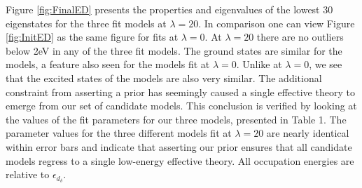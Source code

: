 \documentclass{article}
\begin{document}
Figure \ref{fig:FinalED} presents the properties and eigenvalues of the lowest 30 eigenstates for the three fit models at $\lambda = 20$. 
In comparison one can view Figure \ref{fig:InitED} as the same figure for fits at $\lambda = 0$. 
At $\lambda = 20$ there are no outliers below 2eV in any of the three fit models. 
The ground states are similar for the models, a feature also seen for the models fit at $\lambda = 0$.
Unlike at $\lambda = 0$, we see that the excited states of the models are also very similar.
The additional constraint from asserting a prior has seemingly caused a single effective theory to emerge from our set of candidate models.
This conclusion is verified by looking at the values of the fit parameters for our three models, presented in Table 1.
The parameter values for the three different models fit at $\lambda = 20$ are nearly identical within error bars and indicate that asserting our prior ensures that all candidate models regress to a single low-energy effective theory.
All occupation energies are relative to $\epsilon_{d_\delta}$.
\end{document}
